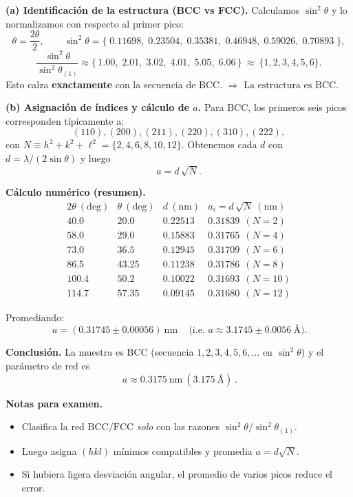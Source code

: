 \documentclass{article}
\begin{document}
\medskip
\textbf{(a) Identificación de la estructura (BCC vs FCC).}  
Calculamos \( \sin^2\theta \) y lo normalizamos con respecto al primer pico:
\[
\theta=\frac{2\theta}{2},\qquad 
\sin^2\theta=\{\;0.11698,\;0.23504,\;0.35381,\;0.46948,\;0.59026,\;0.70893\;\},
\]
\[
\frac{\sin^2\theta}{\sin^2\theta_{(1)}}\approx 
\{\,1.00,\;2.01,\;3.02,\;4.01,\;5.05,\;6.06\,\}\ \approx\ \{1,2,3,4,5,6\}.
\]
Esto calza \textbf{exactamente} con la secuencia de \(\mathrm{BCC}\).  
\(\Rightarrow\) \(\boxed{\text{La estructura es BCC.}}\)

\medskip
\textbf{(b) Asignación de índices y cálculo de \(a\).}  
Para \(\mathrm{BCC}\), los primeros seis picos corresponden típicamente a:
\[
(110),(200),(211),(220),(310),(222),
\]
con \(N\equiv h^2{+}k^2{+}\ell^2=\{2,4,6,8,10,12\}\).  
Obtenemos cada \(d\) con \(d=\lambda/(2\sin\theta)\) y luego
\[
a = d\,\sqrt{N}.
\]

\textbf{Cálculo numérico (resumen).}
\[
\begin{array}{c|c|c|c}
2\theta~(\mathrm{deg}) & \theta~(\mathrm{deg}) & d~(\mathrm{nm}) & a_i=d\,\sqrt{N}~(\mathrm{nm})\\
\hline
40.0 & 20.0 & 0.22513 & 0.31839\ \ (N{=}2)\\
58.0 & 29.0 & 0.15883 & 0.31765\ \ (N{=}4)\\
73.0 & 36.5 & 0.12945 & 0.31709\ \ (N{=}6)\\
86.5 & 43.25 & 0.11238 & 0.31786\ \ (N{=}8)\\
100.4 & 50.2 & 0.10022 & 0.31693\ \ (N{=}10)\\
114.7 & 57.35 & 0.09145 & 0.31680\ \ (N{=}12)
\end{array}
\]

Promediando:
\[
\boxed{\,a = (0.31745 \pm 0.00056)\ \mathrm{nm}\,} 
\quad\text{(i.e. } a \approx 3.1745 \pm 0.0056\ \text{\AA)}.
\]

\medskip
\textbf{Conclusión.}  
La muestra es \(\mathrm{BCC}\) (secuencia \(1,2,3,4,5,6,\dots\) en \(\sin^2\theta\)) y el parámetro de red es
\[
\boxed{\,a \approx 0.3175\ \mathrm{nm}\ (3.175\ \text{\AA})\,}.
\]

\medskip
\textbf{Notas para examen.}
\begin{itemize}
\item Clasifica la red \(\mathrm{BCC/FCC}\) \emph{solo} con las razones \(\sin^2\theta/\sin^2\theta_{(1)}\).
\item Luego asigna \((hkl)\) mínimos compatibles y promedia \(a=d\sqrt{N}\).
\item Si hubiera ligera desviación angular, el promedio de varios picos reduce el error.
\end{itemize}
\end{document}

